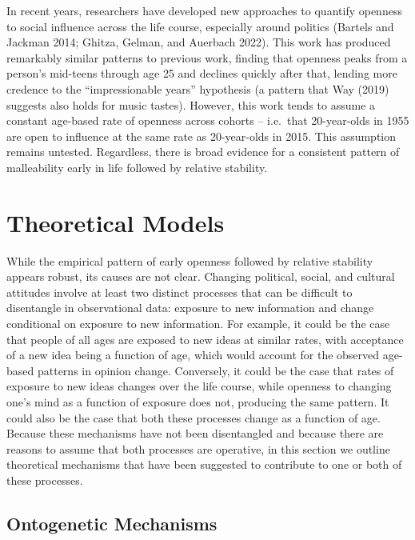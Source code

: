 \documentclass[
  12pt,
]{article}
\begin{document}
In recent years, researchers have developed new approaches to quantify openness to social influence across the life course, especially around politics (Bartels and Jackman 2014; Ghitza, Gelman, and Auerbach 2022). This work has produced remarkably similar patterns to previous work, finding that openness peaks from a person's mid-teens through age 25 and declines quickly after that, lending more credence to the ``impressionable years'' hypothesis (a pattern that Way (2019) suggests also holds for music tastes). However, this work tends to assume a constant age-based rate of openness across cohorts -- i.e.~that 20-year-olds in 1955 are open to influence at the same rate as 20-year-olds in 2015. This assumption remains untested. Regardless, there is broad evidence for a consistent pattern of malleability early in life followed by relative stability.

\hypertarget{theoretical-models}{%
\section{Theoretical Models}\label{theoretical-models}}

While the empirical pattern of early openness followed by relative stability appears robust, its causes are not clear. Changing political, social, and cultural attitudes involve at least two distinct processes that can be difficult to disentangle in observational data: exposure to new information and change conditional on exposure to new information. For example, it could be the case that people of all ages are exposed to new ideas at similar rates, with acceptance of a new idea being a function of age, which would account for the observed age-based patterns in opinion change. Conversely, it could be the case that rates of exposure to new ideas changes over the life course, while openness to changing one's mind as a function of exposure does not, producing the same pattern. It could also be the case that both these processes change as a function of age. Because these mechanisms have not been disentangled and because there are reasons to assume that both processes are operative, in this section we outline theoretical mechanisms that have been suggested to contribute to one or both of these processes.

\hypertarget{ontogenetic-mechanisms}{%
\subsection{Ontogenetic Mechanisms}\label{ontogenetic-mechanisms}}
\end{document}
